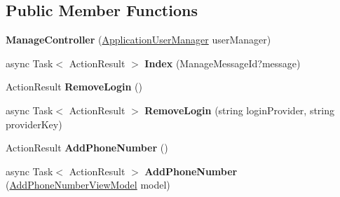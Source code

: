 \subsection*{Public Member Functions}
\begin{DoxyCompactItemize}
\item 
{\bfseries Manage\+Controller} (\hyperlink{class_cloud_bread_admin_web_1_1_application_user_manager}{Application\+User\+Manager} user\+Manager)\hypertarget{class_cloud_bread_admin_web_1_1_controllers_1_1_manage_controller_aaad5030b9b38525b5e8c4f1768f0541e}{}\label{class_cloud_bread_admin_web_1_1_controllers_1_1_manage_controller_aaad5030b9b38525b5e8c4f1768f0541e}

\item 
async Task$<$ Action\+Result $>$ {\bfseries Index} (Manage\+Message\+Id?message)\hypertarget{class_cloud_bread_admin_web_1_1_controllers_1_1_manage_controller_a08959bdc8a1b37a86066d10f224f5e75}{}\label{class_cloud_bread_admin_web_1_1_controllers_1_1_manage_controller_a08959bdc8a1b37a86066d10f224f5e75}

\item 
Action\+Result {\bfseries Remove\+Login} ()\hypertarget{class_cloud_bread_admin_web_1_1_controllers_1_1_manage_controller_a2f175ab4793c56677b07002bc57a887e}{}\label{class_cloud_bread_admin_web_1_1_controllers_1_1_manage_controller_a2f175ab4793c56677b07002bc57a887e}

\item 
async Task$<$ Action\+Result $>$ {\bfseries Remove\+Login} (string login\+Provider, string provider\+Key)\hypertarget{class_cloud_bread_admin_web_1_1_controllers_1_1_manage_controller_ae72da909912ec10c002636297d243f83}{}\label{class_cloud_bread_admin_web_1_1_controllers_1_1_manage_controller_ae72da909912ec10c002636297d243f83}

\item 
Action\+Result {\bfseries Add\+Phone\+Number} ()\hypertarget{class_cloud_bread_admin_web_1_1_controllers_1_1_manage_controller_ac40355c33a7efe87e8502b0f9ada2b81}{}\label{class_cloud_bread_admin_web_1_1_controllers_1_1_manage_controller_ac40355c33a7efe87e8502b0f9ada2b81}

\item 
async Task$<$ Action\+Result $>$ {\bfseries Add\+Phone\+Number} (\hyperlink{class_cloud_bread_admin_web_1_1_models_1_1_add_phone_number_view_model}{Add\+Phone\+Number\+View\+Model} model)\hypertarget{class_cloud_bread_admin_web_1_1_controllers_1_1_manage_controller_a29d9f4e7cf795cbc5d0a1acbc3dd2f3a}{}\label{class_cloud_bread_admin_web_1_1_controllers_1_1_manage_controller_a29d9f4e7cf795cbc5d0a1acbc3dd2f3a}


\end{DoxyCompactItemize}
